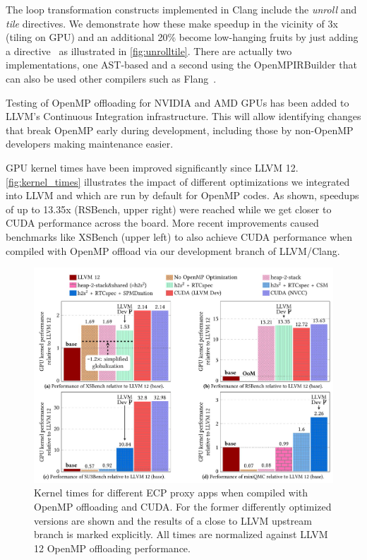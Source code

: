 The loop transformation constructs implemented in Clang include the \emph{unroll} and \emph{tile} directives.
We demonstrate how these make speedup in the vicinity of 3x (tiling on GPU) and an additional 20\% become
low-hanging fruits by just adding a directive~\cite{kruse2021openmpbooth} as illustrated in \autoref{fig:unrolltile}.
There are actually two implementations, one AST-based and a second using the OpenMPIRBuilder that can also be used other compilers such as Flang~\cite{kruse2021clangast}.

Testing of OpenMP offloading for NVIDIA and AMD GPUs has been added to LLVM's Continuous Integration infrastructure.
This will allow identifying changes that break OpenMP early during development, including those by non-OpenMP developers making maintenance easier.

GPU kernel times have been improved significantly since LLVM 12. \autoref{fig:kernel_times} illustrates the impact of
different optimizations we integrated into LLVM and which are run by default for OpenMP codes. As shown, speedups
of up to 13.35x (RSBench, upper right) were reached while we get closer to CUDA
performance across the board. More recent improvements caused benchmarks like
XSBench (upper left) to also achieve CUDA performance when compiled with OpenMP
offload via our development branch of LLVM/Clang.

\begin{figure}[hbt!]
\centering
\includegraphics[width=0.95\linewidth]{LLVM-opt-kernel-times.jpg}
\caption[]{Kernel times for different ECP proxy apps when compiled with OpenMP offloading and CUDA. For the former differently optimized versions are shown and the results of a close to LLVM upstream branch is marked explicitly. All times are normalized against LLVM 12 OpenMP offloading performance.}
\label{fig:kernel_times}
\end{figure}

